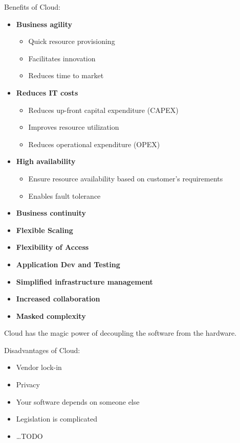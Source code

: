 Benefits of Cloud:
\begin{itemize}
   \item \textbf{Business agility}
   \begin{itemize}
      \item Quick resource provisioning
      \item Facilitates innovation
      \item Reduces time to market
   \end{itemize}
   \item \textbf{Reduces IT costs}
   \begin{itemize}
      \item Reduces up-front capital expenditure (CAPEX)
      \item Improves resource utilization
      \item Reduces operational expenditure (OPEX)
   \end{itemize}
   \item \textbf{High availability}
   \begin{itemize}
      \item Ensure resource availability based on customer's requirements
      \item Enables fault tolerance
   \end{itemize}
   \item \textbf{Business continuity}
   \item \textbf{Flexible Scaling}
   \item \textbf{Flexibility of Access}
   \item \textbf{Application Dev and Testing}
   \item \textbf{Simplified infrastructure management}
   \item \textbf{Increased collaboration}
   \item \textbf{Masked complexity}
\end{itemize}
Cloud has the magic power of decoupling the software from the hardware.

Disadvantages of Cloud:
\begin{itemize}
   \item Vendor lock-in
   \item Privacy
   \item Your software depends on someone else
   \item Legislation is complicated
   \item \dots TODO
\end{itemize}

